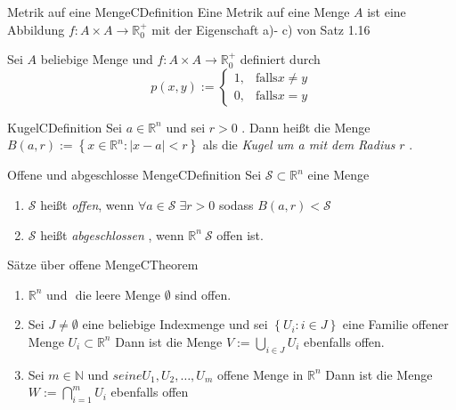 \documentclass[11.5 pt, a4paper]{memoir}
\begin{document}
\begin{ibox}{Metrik auf eine Menge}{CDefinition}
    Eine Metrik auf eine Menge $ A $ ist eine Abbildung $ f: A \times A 
    \to \mathbb{R}_{0}^{+}$ mit der Eigenschaft a)- c) von Satz 1.16 
\end{ibox}
Sei $ A $ beliebige Menge und  $ f: A \times A \to \mathbb{R}_{0}^{+}$
definiert durch $$ p(x,y) := \begin{cases}
    1, &\text{falls} x\neq y \\
    0, &\text{falls} x = y
\end{cases}
 $$
 \begin{ibox}{Kugel}{CDefinition}
     Sei $ a \in \mathbb{R}^{n} $ und sei $ r>0 $ . Dann heißt die Menge $ 
     B(a,r) := \left\{ x \in \mathbb{R}^{n} :\left| x-a \right|< r\right\} $ als die \textit{Kugel um a mit dem Radius } $ r $ .
 \end{ibox}
\begin{ibox}{Offene und abgeschlosse Menge}{CDefinition}
    Sei $ \mathcal{S} \subset \mathbb{R}^{n}$ eine Menge
    \begin{enumerate}[label=\alph*)]
        \item $ \mathcal{S}  $ heißt  \textit{offen}, wenn $ \forall a \in
            \mathcal{S}\; \exists r > 0 $ sodass $ B(a,r) < \mathcal{S}  $ 
        \item $ \mathcal{S} $ heißt \textit{abgeschlossen }, wenn $ 
            \mathbb{R}^n \ \mathcal{S}  $ offen ist. 
      \end{enumerate}
\end{ibox}
\begin{ibox}{Sätze über offene Menge}{CTheorem}
    \begin{enumerate}[label=\alph*)]
        \item $ \mathbb{R}^n \text{ und } $ die leere Menge $ \emptyset $ 
            sind offen.
        \item Sei $ J \neq \emptyset $ eine beliebige Indexmenge und sei 
            $ \left\{ U_{i} : i \in J \right\}  $ eine Familie offener Menge
            $ U_{i} \subset \mathbb{R}^n $  Dann ist die Menge $ V := 
            \bigcup\limits_{i \in J}^{} U_i $ ebenfalls offen. 
        \item Sei $ m \in \mathbb{N} \text{ und } seine U_1, U_2, \dots 
            , U_{m}$ offene Menge in $ \mathbb{R}^n $ Dann ist die Menge $ 
            W:= \bigcap\limits_{i =1}^{m} U_{i}  $ ebenfalls offen
    \end{enumerate}
\end{ibox}
\end{document}
